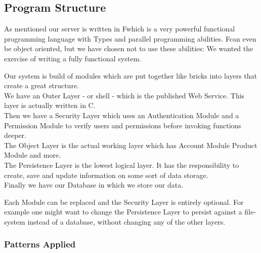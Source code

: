 \subsection{Program Structure}
As mentioned our server is written in F\Sh which is a very powerful functional programming language with Types and parallel programming abilities. F\Sh can even be object oriented, but we have chosen not to use these abilities: We wanted the exercise of writing a fully functional system.

Our system is build of modules which are put together like bricks into layers that create a great structure.
\\We have an Outer Layer - or shell - which is the published Web Service. This layer is actually written in C\Sh.
\\Then we have a Security Layer which uses an Authentication Module and a Permission Module to verify users and permissions before invoking functions deeper.
\\The Object Layer is the actual working layer which has Account Module Product Module and more.
\\The Persistence Layer is the lowest logical layer. It has the responsibility to create, save and update information on some sort of data storage.
\\Finally we have our Database in which we store our data.

Each Module can be replaced and the Security Layer is entirely optional. For example one might want to change the Persistence Layer to persist against a file-system instead of a database, without changing any of the other layers.

\subsubsection{Patterns Applied}
\newpage